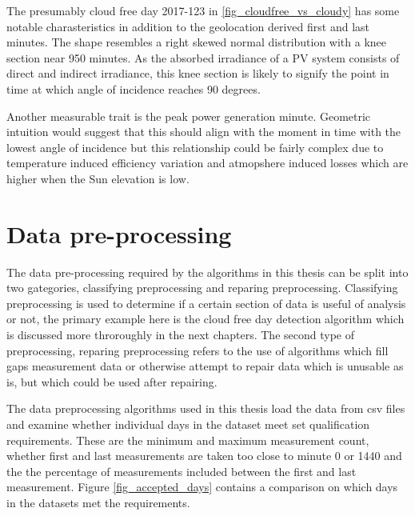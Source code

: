 The presumably cloud free day 2017-123 in \ref{fig_cloudfree_vs_cloudy} has some notable charasteristics in addition to the geolocation derived first and last minutes. The shape resembles a right skewed normal distribution with a knee section near 950 minutes. As the absorbed irradiance of a PV system consists of direct and indirect irradiance, this knee section is likely to signify the point in time at which angle of incidence reaches 90 degrees.

Another measurable trait is the peak power generation minute. Geometric intuition would suggest that this should align with the moment in time with the lowest angle of incidence but this relationship could be fairly complex due to temperature induced efficiency variation and atmopshere induced losses which are higher when the Sun elevation is low.





\newpage
\section{Data pre-processing}
The data pre-processing required by the algorithms in this thesis can be split into two gategories, classifying preprocessing and reparing preprocessing. Classifying preprocessing is used to determine if a certain section of data is useful of analysis or not, the primary example here is the cloud free day detection algorithm which is discussed more throroughly in the next chapters. The second type of preprocessing, reparing preprocessing refers to the use of algorithms which fill gaps measurement data or otherwise attempt to repair data which is unusable as is, but which could be used after repairing.

The data preprocessing algorithms used in this thesis load the data from csv files and examine whether individual days in the dataset meet set qualification requirements. These are the minimum and maximum measurement count, whether first and last measurements are taken too close to minute 0 or 1440 and the the percentage of measurements included between the first and last measurement. Figure \ref{fig_accepted_days} contains a comparison on which days in the datasets met the requirements.


